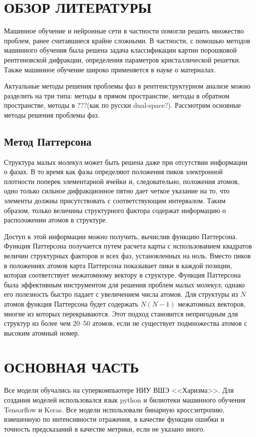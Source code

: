 \documentclass{article}
\begin{document}
\section{ОБЗОР ЛИТЕРАТУРЫ}

Машинное обучение и нейронные сети в частности помогли решить множество проблем, ранее считавшиеся крайне сложными. В частности, с помошью методов машинного обучения была решена \cite{XRD-NN} задача классификации картин порошковой рентгеновской дифракции, определения параметров кристаллической решетки\cite{MCMC}. Также машинное обучение широко применяется в науке о материалах\cite{ML-mat}.

Актуальные методы решения проблемы фаз в рентгенструктурном анализе можно разделить на три типа: методы в прямом пространстве, методы в обратном пространстве, методы в ???(как по русски dual-space?)\cite{XR-ED}. Рассмотрим основные методы решения проблемы фаз.

\subsection{Метод Паттерсона}

Структура малых молекул может быть решена даже при отсутствии информации о фазах. В то время как фазы определяют положения пиков электронной плотности поперек элементарной ячейки и, следовательно, положения атомов, одно только сильное дифракционное пятно дает четкое указание на то, что элементы должны присутствовать с соответствующим интервалом. Таким образом, только величины структурного фактора содержат информацию о расположении атомов в структуре.

Доступ к этой информации можно получить, вычислив функцию Паттерсона\cite{PattersonMethod}. Функция Паттерсона получается путем расчета карты с использованием квадратов величин структурных факторов и всех фаз, установленных на ноль. Вместо пиков в положениях атомов карта Паттерсона показывает пики в каждой позиции, которая соответствует межатомному вектору в структуре. Функция Паттерсона была эффективным инструментом для решения проблем малых молекул; однако его полезность быстро падает с увеличением числа атомов. Для структуры из $N$ атомов функция Паттерсона будет содержать $N (N - 1)$ межатомных векторов, многие из которых перекрываются. Этот подход становится непригодным для структур из более чем 20–50 атомов, если не существует подмножества атомов с высоким атомный номер.



\section{ОСНОВНАЯ ЧАСТЬ}
Все модели обучались на суперкомпьютере НИУ ВШЭ <<Харизма>>. Для создания моделей использовался язык python и билиотеки машинного обучения Tensorflow и Keras. Все модели использовали бинарную кроссэнтропию, взвешенную по интенсивности отражения, в качестве функции ошибки и точность предсказаний в качестве метрики, если не указано иного.
  
\end{document}
